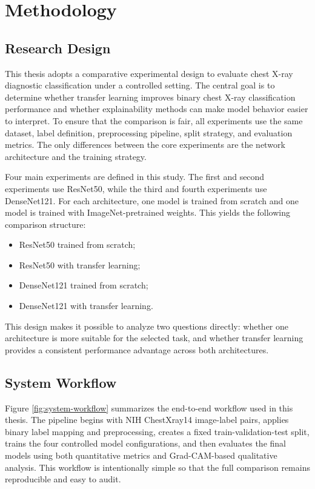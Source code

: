\chapter{Methodology}

\section{Research Design}
This thesis adopts a comparative experimental design to evaluate chest X-ray diagnostic classification under a controlled setting. The central goal is to determine whether transfer learning improves binary chest X-ray classification performance and whether explainability methods can make model behavior easier to interpret. To ensure that the comparison is fair, all experiments use the same dataset, label definition, preprocessing pipeline, split strategy, and evaluation metrics. The only differences between the core experiments are the network architecture and the training strategy.

Four main experiments are defined in this study. The first and second experiments use ResNet50, while the third and fourth experiments use DenseNet121. For each architecture, one model is trained from scratch and one model is trained with ImageNet-pretrained weights. This yields the following comparison structure:
\begin{itemize}
    \item ResNet50 trained from scratch;
    \item ResNet50 with transfer learning;
    \item DenseNet121 trained from scratch;
    \item DenseNet121 with transfer learning.
\end{itemize}
This design makes it possible to analyze two questions directly: whether one architecture is more suitable for the selected task, and whether transfer learning provides a consistent performance advantage across both architectures.

\section{System Workflow}
Figure \ref{fig:system-workflow} summarizes the end-to-end workflow used in this thesis. The pipeline begins with NIH ChestXray14 image-label pairs, applies binary label mapping and preprocessing, creates a fixed train-validation-test split, trains the four controlled model configurations, and then evaluates the final models using both quantitative metrics and Grad-CAM-based qualitative analysis. This workflow is intentionally simple so that the full comparison remains reproducible and easy to audit.

